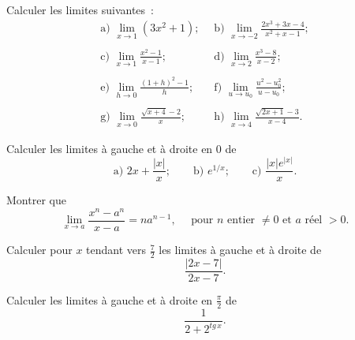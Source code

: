 \documentclass[12pt,french,oneside,a4paper]{memoir} %
\begin{document}
\begin{exo}
  Calculer les limites suivantes~:
  \begin{equation*}
    \begin{array}{ll}
      \mbox{a) }\displaystyle{\lim_{x \rightarrow 1} (3x^2+1)};
      &\mbox{b) }\displaystyle{\lim_{x \rightarrow -2}\frac{2x^3+3x-4}{x^2+x-1}}; \\
      & \\
      \mbox{c) }\displaystyle{\lim_{x \rightarrow 1}\frac{x^2-1}{x-1}}; 
      &\mbox{d) }\displaystyle{\lim_{x \rightarrow 2} \frac{x^3-8}{x-2}}; \\
      & \\
      \mbox{e) }\displaystyle{\lim_{h \rightarrow 0} \frac{(1+h)^2-1}{h}}; \quad 
      &\mbox{f) }\displaystyle{\lim_{u \rightarrow u_0} \frac{u^2-u_0^2}{u-u_0}}; \\
      & \\
      \mbox{g) }\displaystyle{\lim_{x \rightarrow 0} \frac{\sqrt{x+4}-2}{x}}; 
      &\mbox{h) }\displaystyle{\lim_{x \rightarrow 4} \frac{\sqrt{2x+1}-3}{x-4}}.
    \end{array}
  \end{equation*}
\end{exo}

\begin{exo}
Calculer les limites à gauche et à droite en 0 de 
 \begin{equation*}
 \mbox{a) } 2x+ \frac{\vert x \vert}{x}; \qquad \mbox{b) } e^{1/x}; 
 \qquad \mbox{c) } \frac{\vert x \vert e^{\vert x \vert}}{x}.
\end{equation*}
\end{exo}
\begin{exo}
Montrer que
 \begin{equation*}
 \lim_{x \rightarrow a} \frac{x^n-a^n}{x-a}=na^{n-1}, \quad 
 \mbox{ pour }n \mbox{ entier }\neq 0 \mbox{ et } a\mbox{ réel }>0.
\end{equation*}
\end{exo}

\begin{exo}
Calculer pour $x$ tendant vers $\displaystyle{\frac{7}{2}}$ 
 les limites à gauche 
 et à droite de 
 \begin{equation*}
 \frac{\vert 2x-7 \vert}{2x-7}.
\end{equation*}
\end{exo}

\begin{exo}
Calculer les limites à gauche et à droite en $\displaystyle{\frac{\pi}
 {2}}$ de
 \begin{equation*}
 \frac{1}{2+2^{tg \, x}}.
\end{equation*}
\end{exo}
\end{document}
